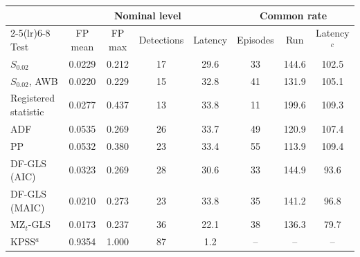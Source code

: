 \begin{tabular}{lccccccc}
\toprule
& \multicolumn{4}{c}{Nominal level} & \multicolumn{3}{c}{Common rate}\\
\cmidrule(lr){2-5}\cmidrule(lr){6-8}
Test & FP mean & FP max & Detections & Latency & Episodes & Run & Latency$^c$\\
\midrule
$S_{0.02}$ & 0.0229 & 0.212 & 17 & 29.6 & 33 & 144.6 & 102.5 \\
$S_{0.02}$, AWB & 0.0220 & 0.229 & 15 & 32.8 & 41 & 131.9 & 105.1 \\
Registered statistic & 0.0277 & 0.437 & 13 & 33.8 & 11 & 199.6 & 109.3 \\
ADF & 0.0535 & 0.269 & 26 & 33.7 & 49 & 120.9 & 107.4 \\
PP & 0.0532 & 0.380 & 23 & 33.4 & 55 & 113.9 & 109.4 \\
DF-GLS (AIC) & 0.0323 & 0.269 & 28 & 30.6 & 33 & 144.9 & 93.6 \\
DF-GLS (MAIC) & 0.0210 & 0.273 & 23 & 33.8 & 35 & 141.2 & 96.8 \\
MZ$_t$-GLS & 0.0173 & 0.237 & 36 & 22.1 & 38 & 136.3 & 79.7 \\
KPSS$^a$ & 0.9354 & 1.000 & 87 & 1.2 & -- & -- & -- \\
\bottomrule
\end{tabular}
